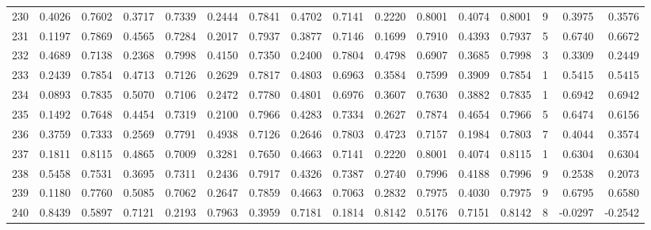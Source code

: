 \begin{tabular}{lrrrrrrrrrrrrrrr}
230 &      0.4026 &  0.7602 &  0.3717 &  0.7339 &  0.2444 &  0.7841 &  0.4702 &  0.7141 &  0.2220 &  0.8001 &   0.4074 &     0.8001 &      9 &                    0.3975 &                     0.3576 \\
231 &      0.1197 &  0.7869 &  0.4565 &  0.7284 &  0.2017 &  0.7937 &  0.3877 &  0.7146 &  0.1699 &  0.7910 &   0.4393 &     0.7937 &      5 &                    0.6740 &                     0.6672 \\
232 &      0.4689 &  0.7138 &  0.2368 &  0.7998 &  0.4150 &  0.7350 &  0.2400 &  0.7804 &  0.4798 &  0.6907 &   0.3685 &     0.7998 &      3 &                    0.3309 &                     0.2449 \\
233 &      0.2439 &  0.7854 &  0.4713 &  0.7126 &  0.2629 &  0.7817 &  0.4803 &  0.6963 &  0.3584 &  0.7599 &   0.3909 &     0.7854 &      1 &                    0.5415 &                     0.5415 \\
234 &      0.0893 &  0.7835 &  0.5070 &  0.7106 &  0.2472 &  0.7780 &  0.4801 &  0.6976 &  0.3607 &  0.7630 &   0.3882 &     0.7835 &      1 &                    0.6942 &                     0.6942 \\
235 &      0.1492 &  0.7648 &  0.4454 &  0.7319 &  0.2100 &  0.7966 &  0.4283 &  0.7334 &  0.2627 &  0.7874 &   0.4654 &     0.7966 &      5 &                    0.6474 &                     0.6156 \\
236 &      0.3759 &  0.7333 &  0.2569 &  0.7791 &  0.4938 &  0.7126 &  0.2646 &  0.7803 &  0.4723 &  0.7157 &   0.1984 &     0.7803 &      7 &                    0.4044 &                     0.3574 \\
237 &      0.1811 &  0.8115 &  0.4865 &  0.7009 &  0.3281 &  0.7650 &  0.4663 &  0.7141 &  0.2220 &  0.8001 &   0.4074 &     0.8115 &      1 &                    0.6304 &                     0.6304 \\
238 &      0.5458 &  0.7531 &  0.3695 &  0.7311 &  0.2436 &  0.7917 &  0.4326 &  0.7387 &  0.2740 &  0.7996 &   0.4188 &     0.7996 &      9 &                    0.2538 &                     0.2073 \\
239 &      0.1180 &  0.7760 &  0.5085 &  0.7062 &  0.2647 &  0.7859 &  0.4663 &  0.7063 &  0.2832 &  0.7975 &   0.4030 &     0.7975 &      9 &                    0.6795 &                     0.6580 \\
240 &      0.8439 &  0.5897 &  0.7121 &  0.2193 &  0.7963 &  0.3959 &  0.7181 &  0.1814 &  0.8142 &  0.5176 &   0.7151 &     0.8142 &      8 &                   -0.0297 &                    -0.2542 \\

\end{tabular}
